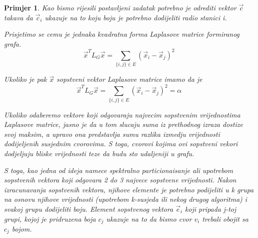 \documentclass[11pt]{article}
\newtheorem{example}{Primjer}
\begin{document}
\begin{example}
        Kao bismo rijesili postavljeni zadatak potrebno je odrediti vektor $\vec{c}$ takava da $\vec{c}_i$ ukazuje na to koju boju je potrebno dodijeliti radio stanici i.

        Prisjetimo se cemu je jednaka kvadratna forma Laplasove matrice formiranog grafa.
        \[
            \vec{x}^T L_G \vec{x} = \sum_{\{i,j\} \in E} (\vec{x}_i - \vec{x}_j)^2
        \]
        
        Ukoliko je pak $\vec{x}$ sopstveni vektor Laplasove matrice imamo da je 
        \[
            \vec{x}^T L_G \vec{x} = \sum_{\{i,j\} \in E} (\vec{x}_i - \vec{x}_j)^2 = \alpha
        \]
        
        Ukoliko odaberemo vektore koji odgovaraju najvecim sopstvenim vrijednostima Laplasove matrice, jasno je da u tom slucaju suma iz prethodnog izraza
        dostize svoj maksim, a upravo ona predstavlja sumu razlika izmedju vrijednosti dodijeljenih susjednim cvorovima. S toga, cvorovi kojima ovi sopstveni 
        vekori dodjeljuju bliske vrijednosti teze da budu sto udaljeniji u grafu.

        S toga, kao jedna od ideja namece spektralno particionaisanje ali upotrebom sopstvenih vektora koji odgovara 2 do 3 najvece sopstvene vrijednosti.
        Nakon izracunavanja sopstvenih vektora, njihove elemente je potrebno podijeliti u k grupa na osnovu njihove vrijednosti (upotrebom k-susjeda ili nekog drugog algoritma) i svakoj grupu dodijeliti boju.
        Element sopstvenog vektora $\vec{e}_i$ koji pripada j-toj grupi, kojoj je pridruzena boja $c_j$ ukazuje na to da bismo cvor $v_i$ trebali obojit sa $c_j$ bojom.

    \end{example}
    
	
\end{document}
